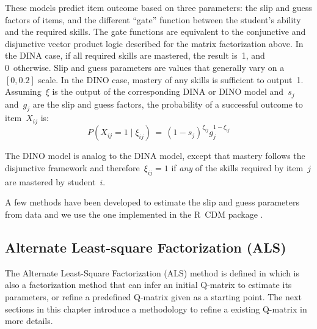 These models predict item outcome based on three parameters: the slip and guess factors of items, and the different ``gate'' function between the student's ability and the required skills.  The gate functions are equivalent to the conjunctive and disjunctive vector product logic described for the matrix factorization above.  In the DINA case, if all required skills are mastered, the result is~1, and 0~otherwise. Slip and guess parameters are values that generally vary on a~$[0,0.2]$ scale. In the DINO case, mastery of any skills is sufficient to output~1.  Assuming~$\xi$ is the output of the corresponding DINA or DINO model and~$s_j$ and~$g_j$ are the slip and guess factors, the probability of a successful outcome to item~$X_{ij}$ is:
\begin{equation}
 P(X_{ij} \!=\! 1 \; | \; \xi_{ij}) \,=\, (1-s_j)^{\xi_{ij}} g_j^{1-\xi_{ij}}
\label{DinoEQ}
\end{equation}

The DINO model is analog to the DINA model, except that mastery follows the disjunctive framework and therefore~$\xi_{ij}=1$ if \textit{any} of the skills required by item~$j$ are mastered by student~$i$.

A few methods have been developed to estimate the slip and guess parameters from data and we use the one implemented in the R~CDM package \citep{Robitzsch2012}.

\subsection{Alternate Least-square Factorization (ALS)}
\label{ALS-Def}



The {Alternate Least-Square Factorization (ALS)} method is defined in \cite{Desmarais2013aied} which is also a factorization method that can infer an initial Q-matrix to estimate its parameters, or refine a predefined Q-matrix given as a starting point. The next sections in this chapter introduce a methodology to refine a existing Q-matrix in more details.


